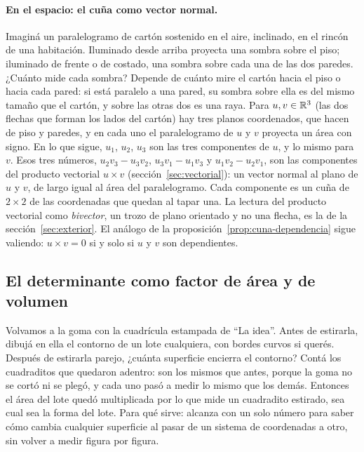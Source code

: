 \paragraph{En el espacio: el cuña como vector normal.} Imaginá un paralelogramo de cartón
sostenido en el aire, inclinado, en el rincón de una habitación. Iluminado desde arriba
proyecta una sombra sobre el piso; iluminado de frente o de costado, una sombra sobre cada una
de las dos paredes. ¿Cuánto mide cada sombra?
Depende de cuánto mire el cartón hacia el piso o hacia cada pared: si está paralelo a una
pared, su sombra sobre ella es del mismo tamaño que el cartón, y sobre las otras dos es una
raya. Para \(u,v\in\mathbb{R}^3\) (las dos flechas que forman los lados del cartón) hay tres planos
coordenados, que hacen de piso y paredes, y en cada uno el paralelogramo de \(u\) y \(v\)
proyecta un área con signo. En lo que sigue, \(u_1\), \(u_2\), \(u_3\) son las tres
componentes de \(u\), y lo mismo para \(v\). Esos
tres números, \(u_2v_3-u_3v_2\), \(u_3v_1-u_1v_3\) y \(u_1v_2-u_2v_1\), son las componentes del producto vectorial \(u\times v\)
(sección~\ref{sec:vectorial}): un vector normal al plano de \(u\) y \(v\), de largo igual al
área del paralelogramo. Cada componente es un cuña de \(2\times2\) de las coordenadas que
quedan al tapar una. La lectura del producto vectorial como \emph{bivector}, un trozo de
plano orientado y no una flecha, es la de la sección~\ref{sec:exterior}. El análogo de la
proposición~\ref{prop:cuna-dependencia} sigue valiendo: \(u\times v=0\) si y solo si \(u\) y
\(v\) son dependientes.

\subsection{El determinante como factor de área y de volumen}\label{sec:det-factor}

Volvamos a la goma con la cuadrícula estampada de \enquote{La idea}. Antes de estirarla,
dibujá en ella el contorno de un lote cualquiera, con bordes curvos si querés. Después de
estirarla parejo, ¿cuánta superficie encierra el contorno?
Contá los cuadraditos que quedaron adentro: son los mismos que antes, porque la goma no se
cortó ni se plegó, y cada uno pasó a medir lo mismo que los demás. Entonces el área del lote
quedó multiplicada por lo que mide un cuadradito estirado, sea cual sea la forma del lote.
Para qué sirve: alcanza con un solo número para saber cómo cambia cualquier superficie al
pasar de un sistema de coordenadas a otro, sin volver a medir figura por figura.

